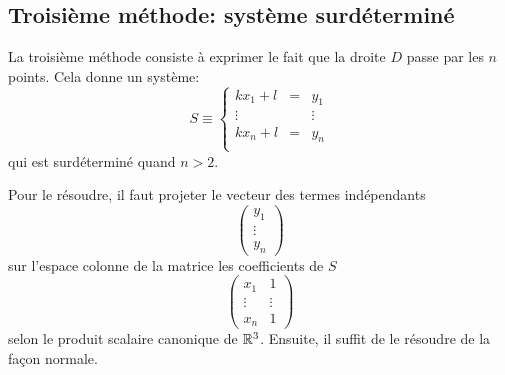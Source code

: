 \subsection{Troisième méthode: système surdéterminé}

La troisième méthode consiste à exprimer
le fait que la droite $D$ passe par les $n$ points.
Cela donne un système:
\begin{equation}
    S\equiv \left\{
        \begin{array}{ccc}
            kx_1+l &=& y_1 \\
            \vdots && \vdots \\
            kx_n+l &=& y_n \\
        \end{array}
    \right.
\end{equation}
qui est surdéterminé quand $n>2$.

Pour le résoudre, il faut projeter le vecteur des termes indépendants
\[
    \left(
        \begin{array}{c}
            y_1\\\vdots\\y_n
        \end{array}
    \right)
\]
sur l'espace colonne de la matrice les coefficients de $S$
\[
    \left(
        \begin{array}{cc}
            x_1&1\\
            \vdots&\vdots\\
            x_n&1
        \end{array}
    \right)
\]
selon le produit scalaire canonique de $\mathbb{R}^3$.
Ensuite, il suffit de le résoudre de la façon normale.
